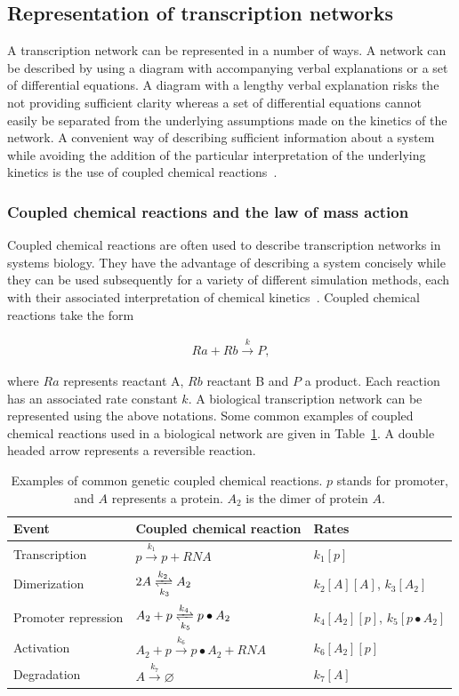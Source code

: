 \subsection{Representation of transcription networks}
A transcription network can be represented in a number of ways. A network can be described by using a diagram with accompanying verbal explanations or a set of differential equations. A diagram with a lengthy verbal explanation risks the not providing sufficient clarity whereas a set of differential equations cannot easily be separated from the underlying assumptions made on the kinetics of the network. A convenient way of describing sufficient information about a system while avoiding the addition of the particular interpretation of the underlying kinetics is the use of coupled chemical reactions~\autocite{Wilkinson:2006td}. 

\subsubsection{Coupled chemical reactions and the law of mass action}

Coupled chemical reactions are often used to describe transcription networks in systems biology. They have the advantage of describing a system concisely while they can be used subsequently for a variety of different simulation methods, each with their associated interpretation of chemical kinetics~\autocite{Wilkinson:2006td}. Coupled chemical reactions take the form


\begin{align}
	Ra + Rb \xrightarrow{k} P, \label{eq:example_eq}
\end{align}

\noindent where $Ra$ represents reactant A, $Rb$ reactant B and $P$ a product. Each reaction has an associated rate constant $k$. A biological transcription network can be represented using the above notations. Some common examples of coupled chemical reactions used in a biological network are given in Table~\ref{tab:chem_reac_ex}. A double headed arrow represents a reversible reaction. 


\begin{table}[tb]
\centering
\caption{Examples of common genetic coupled chemical reactions. $p$ stands for promoter, and $A$ represents a protein. $A_2$ is the dimer of protein $A$.  }
\label{tab:chem_reac_ex}
\begin{tabular}{@{}lll@{}}
\toprule
Event & Coupled chemical reaction & Rates\\ \midrule
Transcription & $p  \xrightarrow{k_1} p + RNA$ & $k_1[p]$\\
Dimerization & $2A \xrightleftharpoons[k_3]{k_2} A_2$&$ k_2[A][A]$, $ k_3[A_2]$\\
Promoter repression & $A_2 + p \xrightleftharpoons[k_5]{k_4} p\bullet A_2$& $ k_4[A_2][p]$, $ k_5[p\bullet A_2]$ \\
Activation & $A_2 + p \xrightarrow{k_6} p\bullet A_2 + RNA$ & $ k_6[A_2][p]$\\
Degradation & $A \xrightarrow{k_7}\varnothing $ &$k_7[A]$\\ \bottomrule
\end{tabular}
\end{table}


